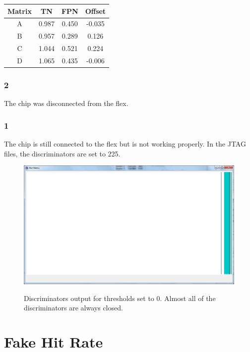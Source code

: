 \documentclass[a4papper, 10pt]{article}
\begin{document}
\begin{itemize}
            \begin{center}
              \begin{tabular}{ c c c c }
                \hline %
         \rowcolor{light-gray}         Matrix  &  TN   &  FPN  &  Offset  \tabularnewline
                \hline %
                \hline %
                    A     & 0.987 & 0.450 & -0.035    \tabularnewline
                \hline %
                    B     & 0.957 & 0.289 & 0.126   \tabularnewline
                \hline %
                    C     & 1.044 & 0.521 & 0.224   \tabularnewline
                \hline %
                    D     & 1.065 & 0.435 & -0.006    \tabularnewline
                \hline %
              \end{tabular}
            \end{center}
    \end{itemize}

    \subsubsection{2}

    The chip was disconnected from the flex.

    \subsubsection{1}

    The chip is still connected to the flex but is not working properly. In the JTAG files, the discriminators are set to 225.

    \begin{figure}[!h]
      \begin{center}
        \includegraphics[width = 12cm]{Pictures/Chip1/discri_0.png}
        \label{fig:discri0_chip1}
        \caption{Discriminators output for thresholds set to 0. Almost all of the discriminators are always closed.}
      \end{center}
    \end{figure}

  \section{Fake Hit Rate}
\end{document}
